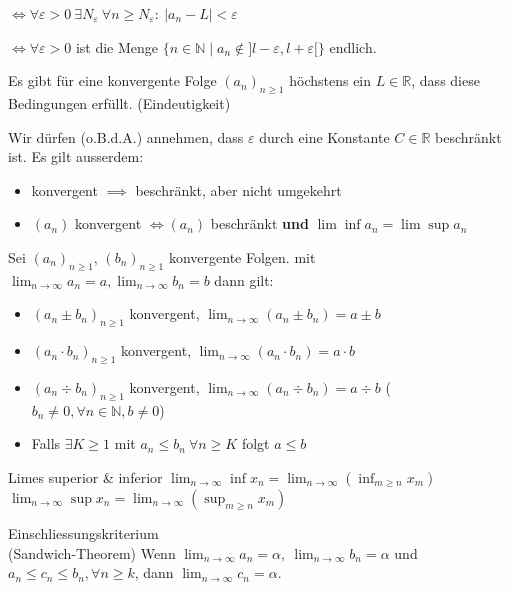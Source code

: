\documentclass[a4paper,fontsize = 7pt]{scrartcl}
\def\limn{\lim_{n\to \infty}}
\def\R{\mathbb{R}}
\def\N{\mathbb{N}}
\begin{document}
$\iff \forall \varepsilon > 0 \ \exists N_\varepsilon \ \forall n \ge N_\varepsilon : \ | a_n - L | < \varepsilon$

$\iff \forall \varepsilon > 0 $ ist die Menge $\{n \in \N \mid a_n \notin ]l-\varepsilon,l+\varepsilon[\}$ endlich. 

Es gibt für eine konvergente Folge $(a_n)_{n \geq 1}$ höchstens ein $L \in \R$, dass diese Bedingungen erfüllt. (Eindeutigkeit)

Wir dürfen (o.B.d.A.) annehmen, dass $\varepsilon $ durch eine Konstante $C \in \R$ beschränkt ist.
Es gilt ausserdem:
\begin{itemize}
 \item konvergent $\implies$ beschränkt, aber nicht umgekehrt
 \item $(a_n)$ konvergent $\iff (a_n)$ beschränkt \textbf{und} $\lim \inf a_n = \lim \sup a_n$
\end{itemize}

Sei $(a_n)_{n \geq 1}$, $(b_n)_{n \geq 1}$ konvergente Folgen. mit \\$\limn a_n = a, \limn b_n = b$ dann gilt:
\begin{itemize}
  \item $(a_n \pm b_n)_{n \geq 1}$ konvergent, $\limn (a_n \pm b_n) = a \pm b$
  \item $(a_n \cdot b_n)_{n \geq 1}$ konvergent, $\limn (a_n \cdot b_n) = a \cdot b$
  \item $(a_n \div  b_n)_{n \geq 1}$ konvergent, $\limn (a_n \div b_n) = a \div b$ ($b_n \neq 0, \forall n \in \N, b \neq 0$)
  \item Falls $\exists K \geq 1$ mit $a_n \leq b_n ~ \forall n \geq K$ folgt $a \leq b$
\end{itemize}

\begin{subbox}{Limes superior \& inferior}
  \vspace{-4pt}
$\limn \inf x_n = \limn \left( \inf_{m \ge n} x_m \right)$ \\
$\limn \sup x_n = \limn \left( \sup_{m \ge n} x_m \right)$
  \vspace{-12pt}
\end{subbox}

\begin{mainbox}{Einschliessungskriterium \\ (Sandwich-Theorem)}
  \vspace{-4pt}
Wenn $\limn a_n = \alpha, \ \limn b_n = \alpha$ und $a_n \le c_n \le b_n, \forall n \ge k$, dann $\limn c_n = \alpha$.
  \vspace{-4pt}
\end{mainbox}
\end{document}
